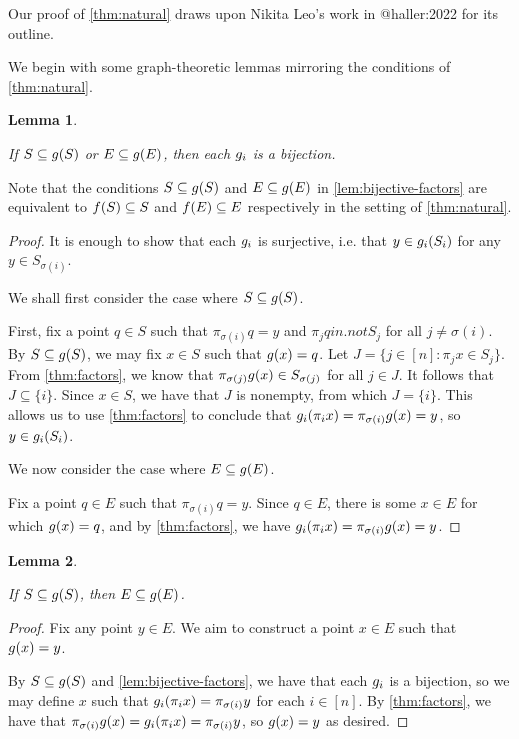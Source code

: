 \documentclass{amsart}
\newtheorem{lemma}{Lemma}[section]
\theoremstyle{definition}
\begin{document}
Our proof of \autoref{thm:natural} draws upon Nikita Leo's work in @haller:2022
for its outline.

We begin with some graph-theoretic lemmas mirroring the conditions of \autoref{thm:natural}.

\begin{lemma} \label{lem:bijective-factors}

  If $S \subseteq g(S)$ or $E \subseteq g(E)$, then each $g_i$ is a bijection.
\end{lemma}

Note that the conditions $S \subseteq g(S)$ and $E \subseteq g(E)$ in \autoref{lem:bijective-factors} are equivalent to $f(S) \subseteq S$ and $f(E) \subseteq E$ respectively in the setting of \autoref{thm:natural}.

\begin{proof} 

  It is enough to show that each $g_i$ is surjective, i.e. that $y \in g_i (S_i)$ for any $y \in S_{\sigma(i)}$.

  We shall first consider the case where $S \subseteq g(S)$.

  First, fix a point $q \in S$ such that $\pi_{\sigma(i)} q = y$ and $\pi_j q in.not S_j$ for all $j \neq \sigma(i)$. By $S \subseteq g(S)$, we may fix $x \in S$ such that $g(x) = q$. Let $J = \{j \in [n] \colon \pi_j x \in S_j\}$. From  \autoref{thm:factors}, we know that $\pi_{\sigma(j)} g(x) \in S_{\sigma(j)}$ for all $j \in J$. It follows that $J \subseteq \{i\}$. Since $x \in S$, we have that $J$ is nonempty, from which $J = \{i\}$. This allows us to use  \autoref{thm:factors} to conclude that $g_i (\pi_i x) = \pi_{\sigma(i)} g(x) = y$, so $y \in g_i (S_i)$.

  We now consider the case where $E \subseteq g(E)$.

  Fix a point $q \in E$ such that $\pi_{\sigma(i)} q = y$. Since $q \in E$, there is some $x \in E$ for which $g(x) = q$, and by  \autoref{thm:factors}, we have $g_i (\pi_i x) = \pi_{\sigma(i)} g(x) = y$.
\end{proof}


\begin{lemma} \label{lem:sphere-implies-extreme}

  If $S \subseteq g(S)$, then $E \subseteq g(E)$.
\end{lemma}

\begin{proof} 

  Fix any point $y \in E$. We aim to construct a point $x \in E$ such that $g(x)=y$.

  By $S \subseteq g(S)$ and \autoref{lem:bijective-factors}, we have that each $g_i$ is a bijection, so we may define $x$ such that $g_i (\pi_i x) = \pi_{\sigma(i)} y$ for each $i \in [n]$. By  \autoref{thm:factors}, we have that $\pi_{\sigma(i)} g(x) = g_i (\pi_i x) = \pi_{\sigma(i)} y$, so $g(x) = y$ as desired.
\end{proof}
\end{document}
